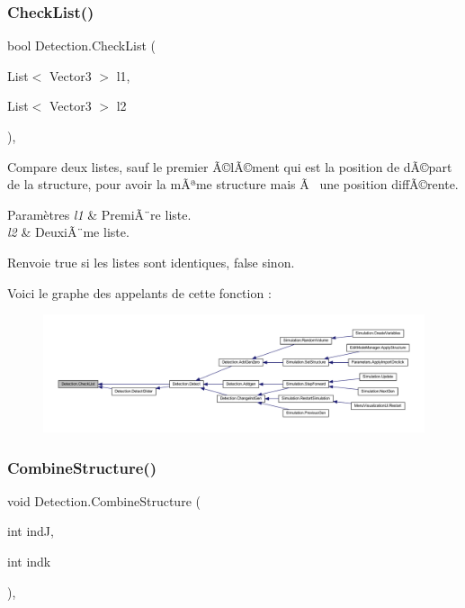 \subsubsection{\texorpdfstring{Check\+List()}{CheckList()}}
{\footnotesize\ttfamily bool Detection.\+Check\+List (\begin{DoxyParamCaption}\item[{List$<$ Vector3 $>$}]{l1,  }\item[{List$<$ Vector3 $>$}]{l2 }\end{DoxyParamCaption})\hspace{0.3cm}{\ttfamily [inline]}, {\ttfamily [private]}}



Compare deux listes, sauf le premier Ã©lÃ©ment qui est la position de dÃ©part de la structure, pour avoir la mÃªme structure mais Ã  une position diffÃ©rente. 


\begin{DoxyParams}{Paramètres}
{\em l1} & PremiÃ¨re liste.\\
\hline
{\em l2} & DeuxiÃ¨me liste.\\
\hline
\end{DoxyParams}
\begin{DoxyReturn}{Renvoie}
true si les listes sont identiques, false sinon.
\end{DoxyReturn}
Voici le graphe des appelants de cette fonction \+:
\nopagebreak
\begin{figure}[H]
\begin{center}
\leavevmode
\includegraphics[width=350pt]{class_detection_a2d8aeb536aa1051f0522f8317b14b36e_icgraph}
\end{center}
\end{figure}
\mbox{\label{class_detection_a7a133b5ef43e949260afb4685766e0ca}} 
\subsubsection{\texorpdfstring{Combine\+Structure()}{CombineStructure()}}
{\footnotesize\ttfamily void Detection.\+Combine\+Structure (\begin{DoxyParamCaption}\item[{int}]{indJ,  }\item[{int}]{indk }\end{DoxyParamCaption})\hspace{0.3cm}{\ttfamily [inline]}, {\ttfamily [private]}}




